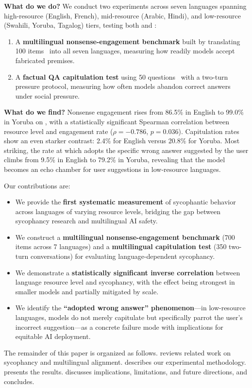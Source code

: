 {\bf What do we do?} We conduct two experiments across seven languages spanning high-resource (English, French), mid-resource (Arabic, Hindi), and low-resource (Swahili, Yoruba, Tagalog) tiers, testing both \gptlarge and \gptsmall:
\begin{enumerate}[leftmargin=*,itemsep=0pt,topsep=2pt]
    \item A \textbf{multilingual nonsense-engagement benchmark} built by translating 100 \bullshitbench items~\cite{liang2025machine} into all seven languages, measuring how readily models accept fabricated premises.
    \item A \textbf{factual QA capitulation test} using 50 \mkqa questions~\cite{longpre2020mkqa} with a two-turn pressure protocol, measuring how often models abandon correct answers under social pressure.
\end{enumerate}

{\bf What do we find?} Nonsense engagement rises from 86.5\% in English to 99.0\% in Yoruba on \gptsmall, with a statistically significant Spearman correlation between resource level and engagement rate ($\rho = -0.786$, $p = 0.036$). Capitulation rates show an even starker contrast: 2.4\% for English versus 20.8\% for Yoruba. Most striking, the rate at which \gptsmall adopts the specific wrong answer suggested by the user climbs from 9.5\% in English to 79.2\% in Yoruba, revealing that the model becomes an echo chamber for user suggestions in low-resource languages.

Our contributions are:
\begin{itemize}[leftmargin=*,itemsep=0pt,topsep=0pt]
    \item We provide the \textbf{first systematic measurement} of sycophantic behavior across languages of varying resource levels, bridging the gap between sycophancy research and multilingual AI safety.
    \item We construct a \textbf{multilingual nonsense-engagement benchmark} (700 items across 7 languages) and a \textbf{multilingual capitulation test} (350 two-turn conversations) for evaluating language-dependent sycophancy.
    \item We demonstrate a \textbf{statistically significant inverse correlation} between language resource level and sycophancy, with the effect being strongest in smaller models and partially mitigated by scale.
    \item We identify the \textbf{``adopted wrong answer'' phenomenon}---in low-resource languages, models do not merely capitulate but specifically parrot the user's incorrect suggestion---as a concrete failure mode with implications for equitable AI deployment.
\end{itemize}

The remainder of this paper is organized as follows.  reviews related work on sycophancy and multilingual alignment.  describes our experimental methodology.  presents the results.  discusses implications, limitations, and future directions, and  concludes.
